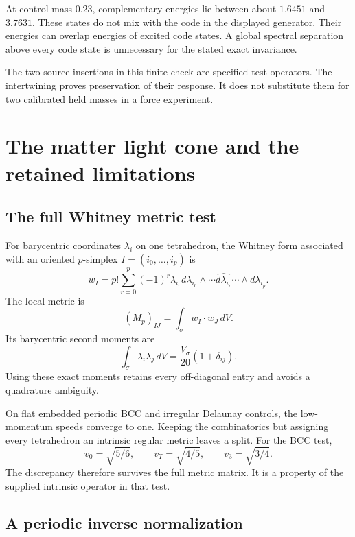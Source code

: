 At control mass $0.23$, complementary energies lie between about $1.6451$ and $3.7631$. These states do not mix with the code in the displayed generator. Their energies can overlap energies of excited code states. A global spectral separation above every code state is unnecessary for the stated exact invariance.

The two source insertions in this finite check are specified test operators. The intertwining proves preservation of their response. It does not substitute them for two calibrated held masses in a force experiment.

\section{The matter light cone and the retained limitations}
\label{sec:cone}

\subsection{The full Whitney metric test}

For barycentric coordinates $\lambda_i$ on one tetrahedron, the Whitney form associated with an oriented $p$-simplex $I=(i_0,\ldots,i_p)$ is
\begin{equation}
w_I=p!\sum_{r=0}^p(-1)^r\lambda_{i_r}
d\lambda_{i_0}\wedge\cdots\widehat{d\lambda_{i_r}}\cdots
\wedge d\lambda_{i_p}.
\end{equation}
The local metric is
\begin{equation}
(M_p)_{IJ}=\int_\sigma w_I\cdot w_J\,dV.
\end{equation}
Its barycentric second moments are
\begin{equation}
\int_\sigma\lambda_i\lambda_j\,dV
=\frac{V_\sigma}{20}(1+\delta_{ij}).
\end{equation}
Using these exact moments retains every off-diagonal entry and avoids a quadrature ambiguity.

On flat embedded periodic BCC and irregular Delaunay controls, the low-momentum speeds converge to one. Keeping the combinatorics but assigning every tetrahedron an intrinsic regular metric leaves a split. For the BCC test,
\begin{equation}
v_0=\sqrt{5/6},\qquad v_T=\sqrt{4/5},\qquad v_3=\sqrt{3/4}.
\end{equation}
The discrepancy therefore survives the full metric matrix. It is a property of the supplied intrinsic operator in that test.

\subsection{A periodic inverse normalization}

